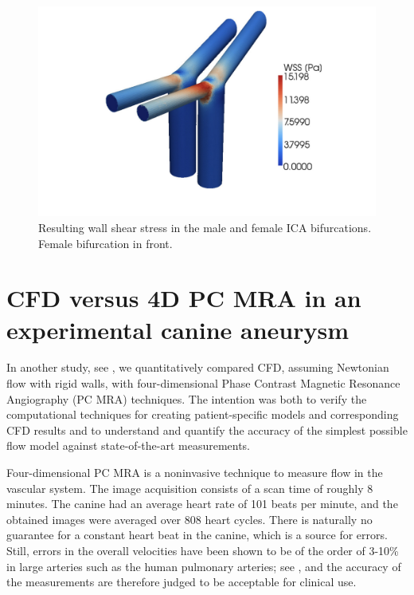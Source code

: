 \begin{figure}
\bwfig
  \centering
  \includegraphics[width=\largefig]{chapters/kvs-2/pdf/icas_wss.pdf}
  \caption{Resulting wall shear stress in the male and female ICA
    bifurcations. Female bifurcation in front.}
  \label{fig:kvs-2:ica_wss_res}
\end{figure}

\section{CFD versus 4D PC MRA in an experimental canine aneurysm} \label{dog_study}

In another study, see \citet{JiangJohnsonValen-SendstadEtAl2010}, we
quantitatively compared CFD, assuming Newtonian flow with rigid walls,
with four-dimensional Phase Contrast Magnetic Resonance Angiography
(PC MRA) techniques. The intention was both to verify the
computational techniques for creating patient-specific models and
corresponding CFD results and to understand and quantify the accuracy
of the simplest possible flow model against state-of-the-art
measurements.

Four-dimensional PC MRA is a noninvasive technique to measure flow in
the vascular system. The image acquisition consists of a scan time of
roughly 8 minutes. The canine had an average heart rate of 101 beats
per minute, and the obtained images were averaged over 808 heart
cycles. There is naturally no guarantee for a constant heart beat in
the canine, which is a source for errors. Still, errors in
the overall velocities have been shown to
be of the order of 3-10\% in large arteries such as the human pulmonary arteries;
see \citet{LotzMeierLeppertEtAl2002,EvansIwaiGristEtAl1993}, and
the accuracy of the measurements are therefore judged to be acceptable
for clinical use.

